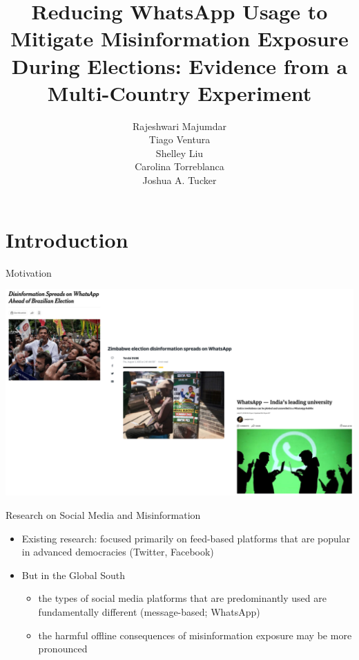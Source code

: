 \documentclass[usenames,dvipsnames,t]{beamer}
\title[]{{ 
\large \bf Reducing WhatsApp Usage to Mitigate Misinformation Exposure During Elections: Evidence from a Multi-Country Experiment}
}
\author[]{\small Rajeshwari Majumdar \\ Tiago Ventura \\ Shelley Liu \\ Carolina Torreblanca \\ Joshua A. Tucker}
\date{\footnotesize %
\vspace{.25cm} 

APSA Annual Meeting \\
September 6, 2024
}
\begin{document}
\begin{frame}[plain]
  \titlepage
\end{frame}




\section{Introduction}



\begin{frame}{Motivation} \small  

\vspace{.25cm} 
\includegraphics[scale=.25]{whatsappmotivation}

\end{frame}


\begin{frame}{Research on Social Media and Misinformation} \small  

\vspace*{\fill}

\begin{itemize}
\item Existing research: focused primarily on feed-based platforms that are popular in advanced democracies (Twitter, Facebook) %
\item But in the Global South %
	\begin{itemize}
	\item the types of social media platforms that are predominantly used are fundamentally different (message-based; WhatsApp)\vspace{.1cm}%
	\item the harmful offline consequences of misinformation exposure may be more pronounced
	\end{itemize}
\end{itemize}

\vspace*{\fill}

\end{frame}
\end{document}
